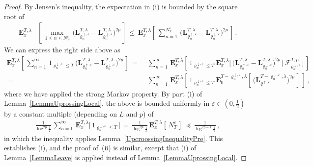 \documentclass[10pt]{article}
\numberwithin{equation}{section}
\theoremstyle{definition}
\begin{document}
\begin{proof} By Jensen's inequality, the expectation in (i)  is bounded by the square root of 
\begin{align*}
 \mathbf{E}^{T,\lambda}_{x}&\left[\,\max_{1\leq n \leq N_{T}^{\varepsilon} }\,\Big(\mathbf{L}_{\varrho_{n}^{\uparrow,\varepsilon}}^{T,\lambda}- \mathbf{L}_{\varrho_{n}^{\downarrow,\varepsilon}}^{T,\lambda}  \Big)^{2p} \,\right] \,\leq \,\mathbf{E}^{T,\lambda}_{x}\left[\,\sum_{n=1}^{N_{T}^{\varepsilon} }\,\Big(\mathbf{L}_{\varrho_{n}^{\uparrow,\varepsilon}}^{T,\lambda}- \mathbf{L}_{\varrho_{n}^{\downarrow,\varepsilon}}^{T,\lambda}  \Big)^{2p} \,\right] \,.
 \end{align*}
 We can express the right side above as
 \begin{align*}
\mathbf{E}^{T,\lambda}_{x}\left[\,\sum_{n=1}^{\infty}\,1_{\varrho_{n}^{\downarrow,\varepsilon}\leq T }\,\Big(\mathbf{L}_{\varrho_{n}^{\uparrow,\varepsilon}}^{T,\lambda}- \mathbf{L}_{\varrho_{n}^{\downarrow,\varepsilon}}^{T,\lambda}  \Big)^{2p} \,\right]\, = \,&\, \sum_{n=1}^{\infty }\,\mathbf{E}^{T,\lambda}_{x}\left[\,1_{ \varrho_{n}^{\downarrow,\varepsilon}\leq T }\,\mathbf{E}^{T,\lambda}_{x}\bigg[\,\Big(\mathbf{L}_{\varrho_{n}^{\uparrow,\varepsilon}}^{T,\lambda}- \mathbf{L}_{\varrho_{n}^{\downarrow,\varepsilon}}^{T,\lambda}  \Big)^{2p}\,\bigg|\,\mathscr{F}_{\varrho_{n}^{\downarrow, \varepsilon} }^{T,\mu}\,\bigg] \,\right]  \\  \, = \,&\, \sum_{n=1}^{\infty }\,\mathbf{E}^{T,\lambda}_{x}\left[\,1_{ \varrho_{n}^{\downarrow,\varepsilon}\leq T }\,\mathbf{E}^{T-\varrho_{n}^{\downarrow ,\varepsilon},\lambda}_{0}\left[\,\Big(\mathbf{L}_{\varrho^{\uparrow,\varepsilon}}^{T-\varrho_{n}^{\downarrow ,\varepsilon},\lambda}\Big)^{2p}\,\right] \,\right] \,,\end{align*}
 where we have applied the strong Markov property.  By part (i) of Lemma~\ref{LemmaUprossingLocal}, the above is bounded uniformly in $\varepsilon\in (0,\frac{1}{2})$  by a constant multiple (depending on $L$ and $p$) of
 \begin{align*}
   \frac{1}{\log^{2p}\frac{1}{\varepsilon}  }\, \sum_{n=1}^{\infty }\,\mathbf{E}^{T,\lambda}_{x}\Big[\,1_{ \varrho_{n}^{\downarrow,\varepsilon}\leq T  } \,\Big]  \, =  \,  \frac{1}{\log^{2p}\frac{1}{\varepsilon}  } \,\mathbf{E}^{T,\lambda}_{x}\left[\,N_{T}^{\varepsilon}\,  \right]\,\preceq \, \frac{1}{\log^{2p-1}\frac{1}{\varepsilon}  }  \,,
\end{align*}
in which the inequality applies  Lemma~\ref{UpcroossingInequalityPre}. This establishes (i),  and the proof of~(ii) is similar, except that   (i) of Lemma~\ref{LemmaLeave} is applied instead of Lemma~\ref{LemmaUprossingLocal}.
\end{proof}
\end{document}
